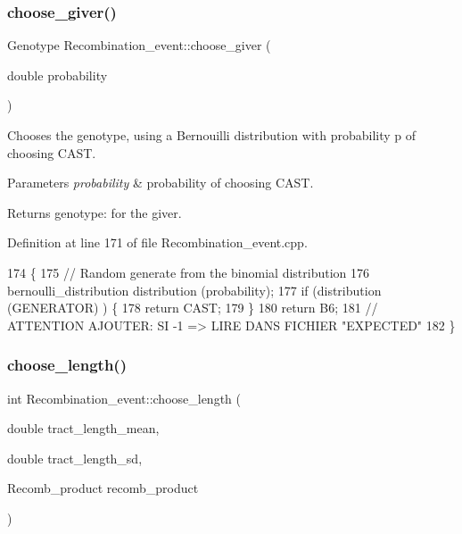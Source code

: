 \subsubsection{\texorpdfstring{choose\+\_\+giver()}{choose\_giver()}}
{\footnotesize\ttfamily Genotype Recombination\+\_\+event\+::choose\+\_\+giver (\begin{DoxyParamCaption}\item[{double}]{probability }\end{DoxyParamCaption})}

Chooses the genotype, using a Bernouilli distribution with probability p of choosing C\+A\+ST.


\begin{DoxyParams}{Parameters}
{\em probability} & probability of choosing C\+A\+ST. \\
\hline
\end{DoxyParams}
\begin{DoxyReturn}{Returns}
genotype\+: for the giver. 
\end{DoxyReturn}


Definition at line 171 of file Recombination\+\_\+event.\+cpp.


\begin{DoxyCode}
174 \{
175     \textcolor{comment}{// Random generate from the binomial distribution}
176     bernoulli\_distribution distribution (probability);
177     \textcolor{keywordflow}{if} (distribution (GENERATOR) ) \{
178         \textcolor{keywordflow}{return} CAST;
179     \}
180     \textcolor{keywordflow}{return} B6;
181     \textcolor{comment}{// ATTENTION AJOUTER: SI -1 => LIRE DANS FICHIER "EXPECTED"}
182 \}
\end{DoxyCode}
\mbox{\label{class_recombination__event_a1e2144e6c77309681613068b418ec949}} 
\subsubsection{\texorpdfstring{choose\+\_\+length()}{choose\_length()}}
{\footnotesize\ttfamily int Recombination\+\_\+event\+::choose\+\_\+length (\begin{DoxyParamCaption}\item[{double}]{tract\+\_\+length\+\_\+mean,  }\item[{double}]{tract\+\_\+length\+\_\+sd,  }\item[{Recomb\+\_\+product}]{recomb\+\_\+product }\end{DoxyParamCaption})}

